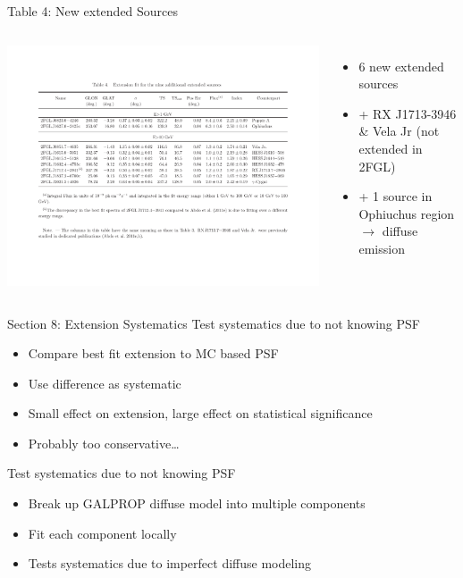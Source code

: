 \documentclass[12pt]{beamer}
\begin{document}
\begin{frame}{Table 4: New extended Sources}
  \begin{columns}
    \includegraphics[scale=0.30]{plots/new_extended.pdf}
    \begin{itemize}
      \item 6 new extended sources
      \item + RX J1713-3946 \& Vela Jr (not extended in 2FGL)
      \item + 1 source in Ophiuchus region $\rightarrow$ diffuse emission
    \end{itemize}
  \end{columns}
\end{frame}


\begin{frame}{Section 8: Extension Systematics}
  Test systematics due to not knowing PSF
  \begin{itemize}
    \item Compare best fit extension to 
      MC based PSF
    \item Use difference as systematic
    \item Small effect on extension, large effect on statistical 
      significance
    \item Probably too conservative\dots
  \end{itemize}
  Test systematics due to not knowing PSF
  \begin{itemize}
    \item Break up GALPROP diffuse model into multiple components 
    \item Fit each component locally
    \item Tests systematics due to imperfect diffuse modeling
  \end{itemize}
\end{frame}
\end{document}
